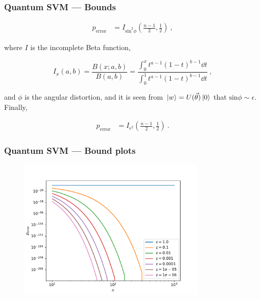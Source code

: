 \begin{frame}
    \frametitle{Quantum SVM --- Bounds}
    \begin{align}
        p_{\text{error}}&= I_{\text{sin}^2\phi}(\frac{n-1}{2}, \frac{1}{2})~,
    \end{align}

    \pause

    where \(I\) is the incomplete Beta function, 

    \begin{equation}
        I_x(a, b) = \frac{B(x; a, b)}{B(a, b)} = \frac{\int_0^x t^{a-1} (1-t)^{b-1} \dd t}{\int_0^1 t^{a-1} (1-t)^{b-1} \dd t}~,
    \end{equation}

    \pause

    and \(\phi\) is the angular distortion, and it is seen from \(\ket*{w} =
    U(\vec{\theta})\ket*{0}\) that \(\text{sin} \phi \sim \epsilon\). Finally,

    \begin{align}
        p_{\text{error}}&= I_{\epsilon^2}(\frac{n-1}{2}, \frac{1}{2})~.
    \end{align}

\end{frame}

\begin{frame}
    \frametitle{Quantum SVM --- Bound plots}

    \begin{figure}
        \includegraphics[width=0.8\textwidth]{figures/perrorplot.pdf}
    \end{figure}

\end{frame}

